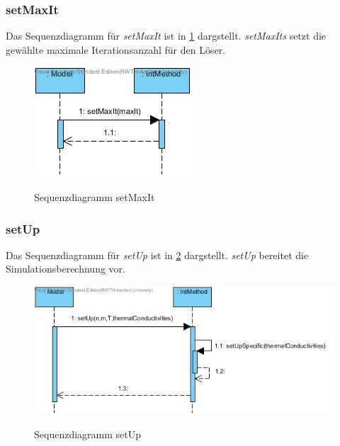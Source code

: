\subsubsection*{setMaxIt}

Das Sequenzdiagramm für \emph{setMaxIt} ist in \ref{Sequenzdiagramm setMaxItIntMethod} dargstellt.
\emph{setMaxIts} setzt die gewählte maximale Iterationsanzahl für den Löser.

\begin{figure}[H]
	\centering
	\includegraphics{Bilder/IntMethod__setMaxIt().jpg}\\
	\caption{Sequenzdiagramm setMaxIt}
	\label{Sequenzdiagramm setMaxItIntMethod}
\end{figure}

\subsubsection*{setUp}

Das Sequenzdiagramm für \emph{setUp} ist in \ref{Sequenzdiagramm setUp} dargstellt. \emph{setUp} bereitet die Simulationsberechnung vor.

\begin{figure}[H]
	\centering
	\includegraphics[scale=.6]{Bilder/IntMethod__setUp().jpg}\\
	\caption{Sequenzdiagramm setUp}
	\label{Sequenzdiagramm setUp}
\end{figure}

